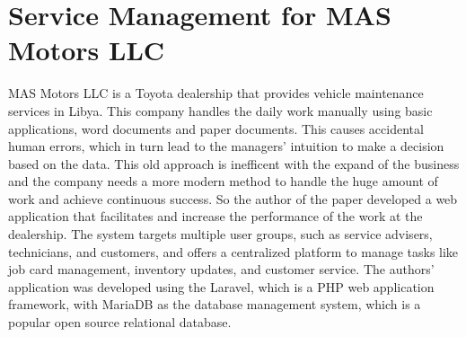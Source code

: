 




\section{Service Management for MAS Motors LLC}

MAS Motors LLC is a Toyota dealership that provides vehicle maintenance services in Libya.
This company handles the daily work manually using basic applications, word documents and paper documents.
This causes accidental human errors, which in turn lead to the managers' intuition to make a decision based on the data.
This old approach is inefficent with the expand of the business and the company needs a more modern method to handle the huge amount of work and achieve continuous success. \cite{MARS_MOTORS}
So the author of the paper developed a web application that facilitates and increase the performance of the work at the dealership.
The system targets multiple user groups, such as service advisers, technicians, and customers, and offers a centralized platform to manage tasks like job card management, inventory updates, and customer service. \cite{MARS_MOTORS}
The authors' application was developed using the Laravel, which is a PHP web application framework, with MariaDB as the database management system, which is a popular open source relational database.

